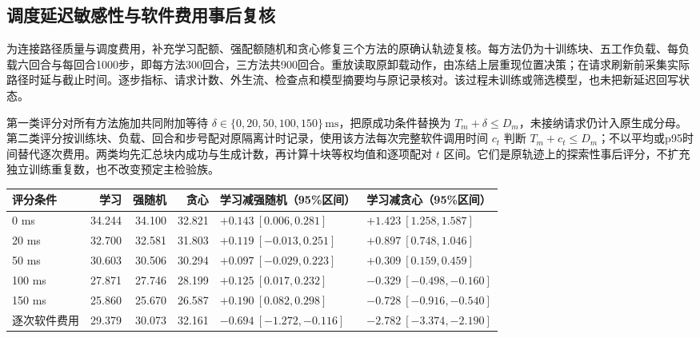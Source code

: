 \subsection{调度延迟敏感性与软件费用事后复核}
\label{sec:ch5-delay-audit}

为连接路径质量与调度费用，补充学习配额、强配额随机和贪心修复三个方法的原确认轨迹复核。每方法仍为十训练块、五工作负载、每负载六回合与每回合1000步，即每方法300回合，三方法共900回合。重放读取原卸载动作，由冻结上层重现位置决策；在请求刷新前采集实际路径时延与截止时间。逐步指标、请求计数、外生流、检查点和模型摘要均与原记录核对。该过程未训练或筛选模型，也未把新延迟回写状态。

第一类评分对所有方法施加共同附加等待 $\delta\in\{0,20,50,100,150\}\,\mathrm{ms}$，把原成功条件替换为 $T_m+\delta\leq D_m$，未接纳请求仍计入原生成分母。第二类评分按训练块、负载、回合和步号配对原隔离计时记录，使用该方法每次完整软件调用时间 $c_t$ 判断 $T_m+c_t\leq D_m$；不以平均或p95时间替代逐次费用。两类均先汇总块内成功与生成计数，再计算十块等权均值和逐项配对 $t$ 区间。它们是原轨迹上的探索性事后评分，不扩充独立训练重复数，也不改变预定主检验族。

\begin{table}[!htbp]
 \centering
 \label{tab:ch5-delay-audit}
 \footnotesize
 \setlength{\tabcolsep}{3pt}
 \begin{tabular}{lrrrll}
  \toprule
  评分条件 & 学习 & 强随机 & 贪心 & 学习减强随机（95\%区间） & 学习减贪心（95\%区间） \\
  \midrule
  0 ms & 34.244 & 34.100 & 32.821 & $+0.143\ [0.006,0.281]$ & $+1.423\ [1.258,1.587]$ \\
  20 ms & 32.700 & 32.581 & 31.803 & $+0.119\ [-0.013,0.251]$ & $+0.897\ [0.748,1.046]$ \\
  50 ms & 30.603 & 30.506 & 30.294 & $+0.097\ [-0.029,0.223]$ & $+0.309\ [0.159,0.459]$ \\
  100 ms & 27.871 & 27.746 & 28.199 & $+0.125\ [0.017,0.232]$ & $-0.329\ [-0.498,-0.160]$ \\
  150 ms & 25.860 & 25.670 & 26.587 & $+0.190\ [0.082,0.298]$ & $-0.728\ [-0.916,-0.540]$ \\
  逐次软件费用 & 29.379 & 30.073 & 32.161 & $-0.694\ [-1.272,-0.116]$ & $-2.782\ [-3.374,-2.190]$ \\
  \bottomrule
 \end{tabular}
\end{table}

